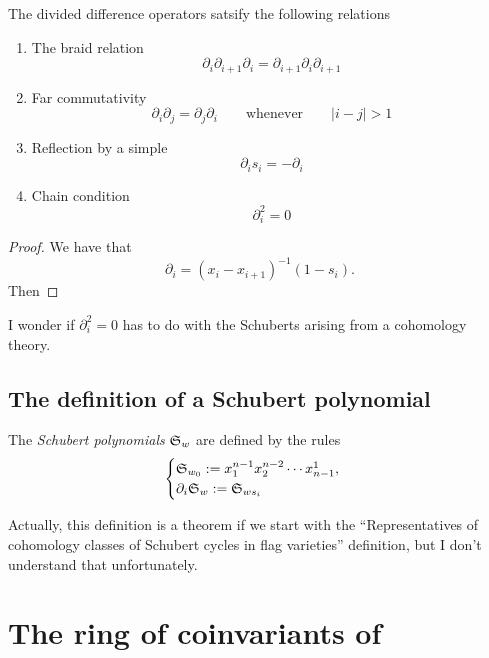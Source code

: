 \documentclass{article}
\newcommand{\frkS}{\ensuremath\mathfrak{S}}
\begin{document}
\begin{theorem}
    The divided difference operators satsify the following relations
    \begin{enumerate}[label=(\alph*)]
        \item The braid relation
            \begin{equation}
                \partial_i\partial_{i+1}\partial_i = \partial_{i+1}\partial_i\partial_{i+1}
            \end{equation}
        \item Far commutativity
            \[
                \partial_i\partial_j = \partial_j\partial_i\qquad \text{whenever}\qquad|i-j| > 1
            \]
        \item Reflection by a simple
            \[
                \partial_is_i = -\partial_i
            \]
        \item Chain condition
            \[
                \partial_i^2 = 0
            \]
    \end{enumerate}
\end{theorem}

\begin{proof}
    We have that
    \[
        \partial_i = (x_i-x_{i+1})^{-1}(1 - s_i).
    \]
    Then
\end{proof}

I wonder if $\partial_i^2 = 0$ has to do with the Schuberts arising from a cohomology theory.

\subsection{The definition of a Schubert polynomial}

\begin{definition}
    The \textit{Schubert polynomials} $\frkS_w$ are defined by the rules
    \[
        \begin{cases}
        \frkS_{w_0} := x_1^{n-1}x_2^{n-2}\cdots x_{n-1}^1, \\
        \partial_i\frkS_w := \frkS_{ws_i}
        \end{cases}
    \]
\end{definition}

Actually, this definition is a theorem if we start with the ``Representatives of cohomology classes of Schubert cycles in flag varieties'' definition, but I don't understand that unfortunately.

\section{The ring of coinvariants of}
\end{document}
